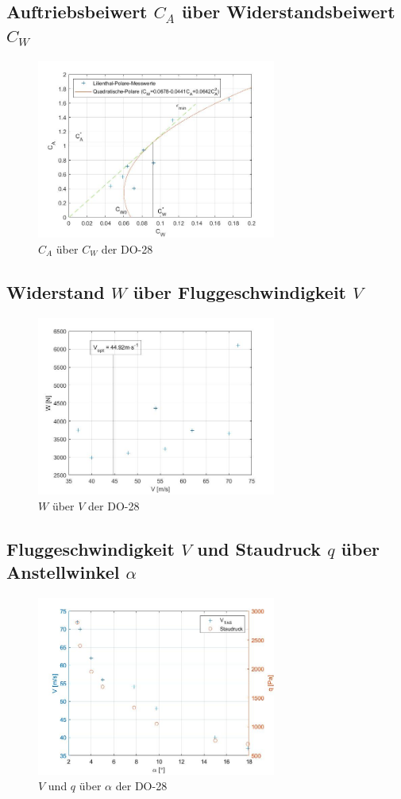 \subsection{Auftriebsbeiwert $C_{A}$ über Widerstandsbeiwert $C_{W}$}

\begin{figure}[H]
	\centering	\includegraphics[width=0.7\textwidth]{./Bilder/CA_CW_DO28_NEU.jpg}
	\caption{$C_{A}$ über $C_{W}$ der DO-28}
	\label{fig:CA_CW_DO28}
\end{figure}

\subsection{Widerstand $W$ über Fluggeschwindigkeit $V$}

\begin{figure}[H]
	\centering	\includegraphics[width=0.7\textwidth]{./Bilder/W_V_DO28_NEU.jpg}
	\caption{$W$ über $V$ der DO-28}
	\label{fig:W_V_DO28}
\end{figure}


\subsection{Fluggeschwindigkeit $V$ und Staudruck $q$ über Anstellwinkel $\alpha$}

\begin{figure}[H]
	\centering	\includegraphics[width=0.7\textwidth]{./Bilder/V_q_alpha.jpg}
	\caption{$V$ und $q$ über $\alpha$ der DO-28}
	\label{fig:V_q_alpha_DO28}
\end{figure}